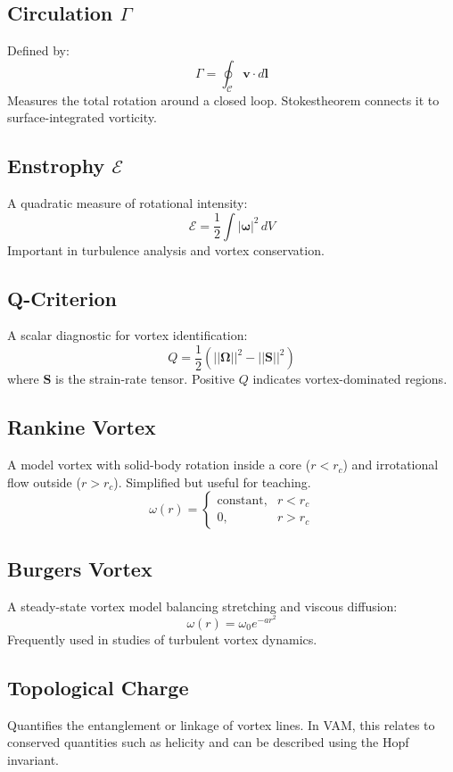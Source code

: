 \documentclass[a4paper, aps,preprint,superscriptaddress, 12pt]{revtex4}
\begin{document}
    \subsection*{Circulation $\Gamma$}
    Defined by:
    \[ \Gamma = \oint_{\mathcal{C}} \mathbf{v} \cdot d\mathbf{l} \]
    Measures the total rotation around a closed loop. Stokes\rqs  theorem connects it to surface-integrated vorticity.

    \subsection*{Enstrophy $\mathcal{E}$}
    A quadratic measure of rotational intensity:
    \[ \mathcal{E} = \frac{1}{2} \int |\boldsymbol{\omega}|^2 \, dV \]
    Important in turbulence analysis and vortex conservation.

    \subsection*{Q-Criterion}
    A scalar diagnostic for vortex identification:
    \[ Q = \frac{1}{2}(||\boldsymbol{\Omega}||^2 - ||\mathbf{S}||^2) \]
    where $\mathbf{S}$ is the strain-rate tensor. Positive $Q$ indicates vortex-dominated regions.

    \subsection*{Rankine Vortex}
    A model vortex with solid-body rotation inside a core ($r < r_c$) and irrotational flow outside ($r > r_c$). Simplified but useful for teaching.
    \[ \omega(r) =
    \begin{cases}
        \text{constant}, & r < r_c \\
        0, & r > r_c
    \end{cases}
    \]

    \subsection*{Burgers Vortex}
    A steady-state vortex model balancing stretching and viscous diffusion:
    \[ \omega(r) = \omega_0 e^{-a r^2} \]
    Frequently used in studies of turbulent vortex dynamics.

    \subsection*{Topological Charge}
    Quantifies the entanglement or linkage of vortex lines. In VAM, this relates to conserved quantities such as helicity and can be described using the Hopf invariant.
\end{document}
